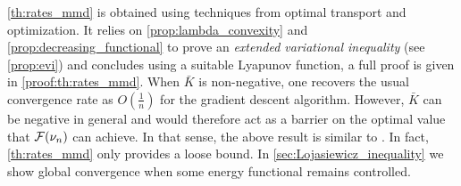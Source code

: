 \cref{th:rates_mmd} is obtained using techniques from optimal transport and optimization. It relies on \cref{prop:lambda_convexity} and \cref{prop:decreasing_functional} to prove an \textit{extended variational inequality} (see \cref{prop:evi}) and concludes using a suitable Lyapunov function, a full proof is given in \cref{proof:th:rates_mmd}.
When $\bar{K}$ is non-negative, one recovers the usual convergence rate as $O(\frac{1}{n})$ for the gradient descent algorithm. However, $\bar{K}$ can be negative in general and would therefore act as a barrier on the optimal value that ${{\mathcal F}}(\nu_n)$ can achieve. In that sense, the above result is similar to \cite[Theorem 6.9]{Bottou:2017}. In fact, \cref{th:rates_mmd} only provides a loose bound. In \cref{sec:Lojasiewicz_inequality} we show global convergence when some energy functional remains controlled.



